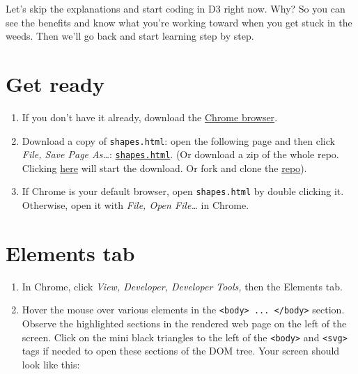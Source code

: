 \documentclass[openany]{book}
\begin{document}
Let's skip the explanations and start coding in D3 right now. Why? So you can see the benefits and know what you're working toward when you get stuck in the weeds. Then we'll go back and start learning step by step.

\hypertarget{get-ready}{%
\section{Get ready }\label{get-ready}}

\begin{enumerate}
\def\labelenumi{\arabic{enumi}.}
\item
  If you don't have it already, download the \href{https://www.google.com/chrome/}{Chrome browser}.
\item
  Download a copy of \texttt{shapes.html}: open the following page and then click \emph{File, Save Page As\ldots{}}: \href{https://raw.githubusercontent.com/jtr13/d3book/master/code/shapes.html}{\texttt{shapes.html}}. (Or download a zip of the whole repo. Clicking \href{https://github.com/jtr13/d3book/archive/master.zip}{here} will start the download. Or fork and clone the \href{https://github.com/jtr13/d3book}{repo}).
\item
  If Chrome is your default browser, open \texttt{shapes.html} by double clicking it. Otherwise, open it with \emph{File, Open File\ldots{}} in Chrome.
\end{enumerate}

\hypertarget{elements-tab}{%
\section{Elements tab }\label{elements-tab}}

\begin{enumerate}
\def\labelenumi{\arabic{enumi}.}
\item
  In Chrome, click \emph{View, Developer, Developer Tools,} then the Elements tab.
\item
  Hover the mouse over various elements in the \texttt{\textless{}body\textgreater{}\ ...\ \textless{}/body\textgreater{}} section. Observe the highlighted sections in the rendered web page on the left of the screen. Click on the mini black triangles to the left of the \texttt{\textless{}body\textgreater{}} and \texttt{\textless{}svg\textgreater{}} tags if needed to open these sections of the DOM tree. Your screen should look like this:
\end{enumerate}
\end{document}
